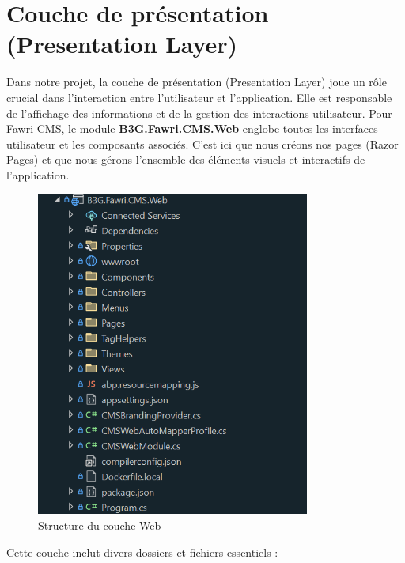 \section{Couche de présentation (Presentation Layer)}

\hspace{\parindent}Dans notre projet, la couche de présentation (Presentation Layer) joue un rôle crucial dans l'interaction entre l'utilisateur et l'application. Elle est responsable de l'affichage des informations et de la gestion des interactions utilisateur. Pour Fawri-CMS, le module \textbf{B3G.Fawri.CMS.Web} englobe toutes les interfaces utilisateur et les composants associés. C'est ici que nous créons nos pages (Razor Pages) et que nous gérons l'ensemble des éléments visuels et interactifs de l'application.



\begin{figure}[H]
    \centering
    \includegraphics[width=9cm]{Figures/web folder.PNG}
    \caption{Structure du couche Web}
\end{figure}


Cette couche inclut divers dossiers et fichiers essentiels :

